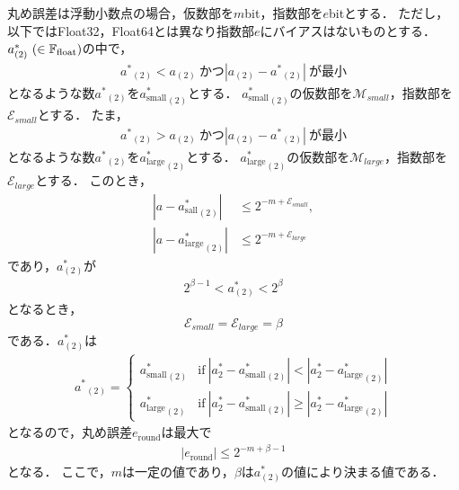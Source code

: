 丸め誤差は浮動小数点の場合，仮数部を$m$bit，指数部を$e$bitとする．
ただし，以下ではFloat32，Float64とは異なり指数部$e$にバイアスはないものとする．
$a^{\ast}_{(2)} \ (\in \mathbb{F}_{\text{float}})$の中で，
\begin{align}
    {a^{\ast}}_{(2)} < a_{(2)}\ \text{かつ} |a_{(2)} - {a^{\ast}}_{(2)}| \ \text{が最小}
\end{align}
となるような数${a^{\ast}}_{(2)}$を${a^{\ast}_{\mathrm{small}}}_{(2)}$とする．
${a^{\ast}_{\mathrm{small}}}_{(2)}$の仮数部を$\mathcal{M}_{small}$，指数部を$\mathcal{E}_{small}$とする．
たま，
\begin{align}
    {a^{\ast}}_{(2)} > a_{(2)} \ \text{かつ} |a_{(2)} - {a^{\ast}}_{(2)}| \ \text{が最小}
\end{align}
となるような数${a^{\ast}}_{(2)}$を${a^{\ast}_{\mathrm{large}}}_{(2)}$とする．
${a^{\ast}_{\mathrm{large}}}_{(2)}$の仮数部を$\mathcal{M}_{large}$，指数部を$\mathcal{E}_{large}$とする．
このとき，
\begin{align}
    |a - {a^{\ast}_{\mathrm{sall}}}_{(2)}| &\leq 2^{-m+{\mathcal{E}_{small}}}, \\
    |a - {a^{\ast}_{\mathrm{large}}}_{(2)}| &\leq 2^{-m+{\mathcal{E}_{large}}}
\end{align}
であり，$a^{\ast}_{(2)}$が
\begin{align}
    2^{\beta -1} < a^{\ast}_{(2)} < 2^{\beta}
\end{align}
となるとき，
\begin{equation}
    \mathcal{E}_{small} = \mathcal{E}_{large} = \beta
\end{equation}
である．$a^{\ast}_{(2)}$は
\begin{align}
    {a^{\ast}}_{(2)} = \left\{ 
        \begin{array}{ll}
            {a^{\ast}_{\mathrm{small}}}_{(2)} &\text{if} \ |a^{\ast}_{2} - {a^{\ast}_{\mathrm{small}}}_{(2)} | < |a^{\ast}_{2} - {a^{\ast}_{\mathrm{large}}}_{(2)} | \\
            {a^{\ast}_{\mathrm{large}}}_{(2)} &\text{if} \ |a^{\ast}_{2} - {a^{\ast}_{\mathrm{small}}}_{(2)} | \geq |a^{\ast}_{2} - {a^{\ast}_{\mathrm{large}}}_{(2)} | 
        \end{array}
    \right.
\end{align}
となるので，丸め誤差$e_{\mathrm{round}}$は最大で
\begin{align}
    \label{eq:rounderror_float}
    |e_{\mathrm{round}}| \leq 2^{-m+\beta -1}
\end{align}
となる．
ここで，$m$は一定の値であり，$\beta$は$a^{\ast}_{(2)}$の値により決まる値である．


